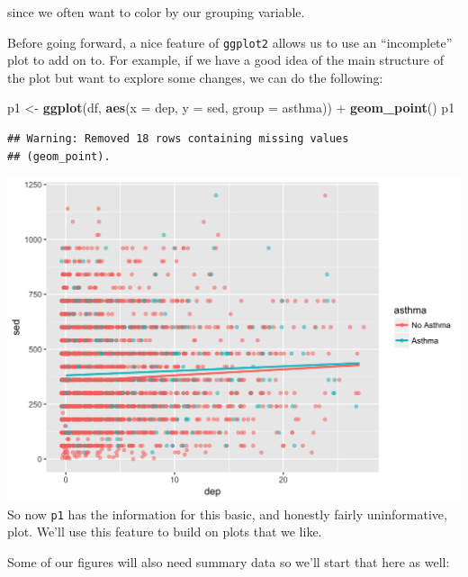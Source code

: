 \documentclass[]{tufte-book}
\newenvironment{Shaded}{}{}
\newcommand{\KeywordTok}[1]{\textcolor[rgb]{0.00,0.44,0.13}{\textbf{#1}}}
\newcommand{\DataTypeTok}[1]{\textcolor[rgb]{0.56,0.13,0.00}{#1}}
\newcommand{\StringTok}[1]{\textcolor[rgb]{0.25,0.44,0.63}{#1}}
\newcommand{\OtherTok}[1]{\textcolor[rgb]{0.00,0.44,0.13}{#1}}
\newcommand{\OperatorTok}[1]{\textcolor[rgb]{0.40,0.40,0.40}{#1}}
\newcommand{\NormalTok}[1]{#1}
\theoremstyle{definition}
\theoremstyle{definition}
\theoremstyle{remark}
\begin{document}
since we often want to color by our grouping variable.

Before going forward, a nice feature of \texttt{ggplot2} allows us to
use an ``incomplete'' plot to add on to. For example, if we have a good
idea of the main structure of the plot but want to explore some changes,
we can do the following:

\begin{Shaded}
\begin{Highlighting}[]
\NormalTok{p1 <-}\StringTok{ }\KeywordTok{ggplot}\NormalTok{(df, }\KeywordTok{aes}\NormalTok{(}\DataTypeTok{x =}\NormalTok{ dep, }\DataTypeTok{y =}\NormalTok{ sed, }\DataTypeTok{group =}\NormalTok{ asthma)) }\OperatorTok{+}\StringTok{ }
\StringTok{    }\KeywordTok{geom_point}\NormalTok{()}
\NormalTok{p1}
\end{Highlighting}
\end{Shaded}

\begin{verbatim}
## Warning: Removed 18 rows containing missing values
## (geom_point).
\end{verbatim}

\includegraphics{_main_files/figure-latex/unnamed-chunk-137-1} So now
\texttt{p1} has the information for this basic, and honestly fairly
uninformative, plot. We'll use this feature to build on plots that we
like.

Some of our figures will also need summary data so we'll start that here
as well:

\begin{Shaded}
\end{Shaded}
\end{document}
